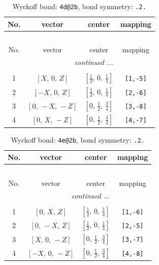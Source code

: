 \documentclass[fleqn,8pt]{jsarticle}
\begin{document}
\begin{longtable}{cccc}
\caption{Wyckoff bond: {\tt 4d@2b}, bond symmetry: {\tt .2.}}
 \\
 \hline \hline
No. & vector & center & mapping \\ \hline \endfirsthead

\multicolumn{3}{l}{\tablename\ \thetable{}} \\
 \hline \hline
No. & vector & center & mapping \\ \hline \endhead

 \hline \hline
\multicolumn{3}{r}{\footnotesize\it continued ...} \\ \endfoot

 \hline \hline
\multicolumn{3}{r}{} \\ \endlastfoot

1 & $\left[ X,\, 0,\, Z \right]$ & $\left[ \frac{1}{2},\, 0,\, \frac{1}{4} \right]$ & {\tt [1,-5]} \\ \hline
2 & $\left[ - X,\, 0,\, Z \right]$ & $\left[ \frac{1}{2},\, 0,\, \frac{1}{4} \right]$ & {\tt [2,-6]} \\ \hline
3 & $\left[ 0,\, - X,\, - Z \right]$ & $\left[ 0,\, \frac{1}{2},\, \frac{3}{4} \right]$ & {\tt [3,-8]} \\ \hline
4 & $\left[ 0,\, X,\, - Z \right]$ & $\left[ 0,\, \frac{1}{2},\, \frac{3}{4} \right]$ & {\tt [4,-7]} \\
\end{longtable}
\renewcommand{\arraystretch}{1.2}
\begin{longtable}{cccc}
\caption{Wyckoff bond: {\tt 4e@2b}, bond symmetry: {\tt .2.}}
 \\
 \hline \hline
No. & vector & center & mapping \\ \hline \endfirsthead

\multicolumn{3}{l}{\tablename\ \thetable{}} \\
 \hline \hline
No. & vector & center & mapping \\ \hline \endhead

 \hline \hline
\multicolumn{3}{r}{\footnotesize\it continued ...} \\ \endfoot

 \hline \hline
\multicolumn{3}{r}{} \\ \endlastfoot

1 & $\left[ 0,\, X,\, Z \right]$ & $\left[ \frac{1}{2},\, 0,\, \frac{1}{4} \right]$ & {\tt [1,-6]} \\ \hline
2 & $\left[ 0,\, - X,\, Z \right]$ & $\left[ \frac{1}{2},\, 0,\, \frac{1}{4} \right]$ & {\tt [2,-5]} \\ \hline
3 & $\left[ X,\, 0,\, - Z \right]$ & $\left[ 0,\, \frac{1}{2},\, \frac{3}{4} \right]$ & {\tt [3,-7]} \\ \hline
4 & $\left[ - X,\, 0,\, - Z \right]$ & $\left[ 0,\, \frac{1}{2},\, \frac{3}{4} \right]$ & {\tt [4,-8]} \\
\end{longtable}
\end{document}
